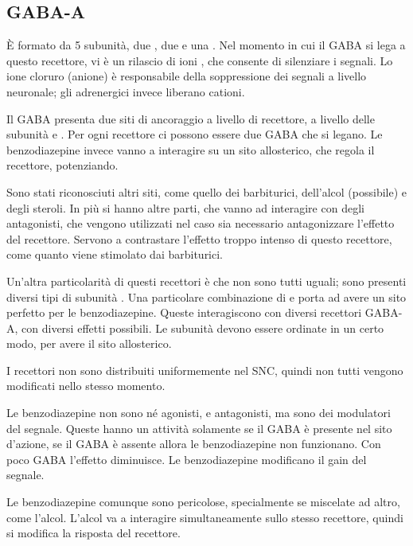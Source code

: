 \subsection{GABA-A}


È formato da 5 subunità, due \alpha, due \beta{} e una \gamma. Nel
momento in cui il GABA si lega a questo recettore, vi è un rilascio di
ioni , che consente di silenziare i segnali.
Lo ione cloruro (anione) è responsabile della soppressione dei segnali a
livello neuronale; gli adrenergici invece liberano cationi.

Il GABA presenta due siti di ancoraggio a livello di recettore, a
livello delle subunità \alpha{} e \beta. Per ogni recettore ci possono
essere due GABA che si legano.
Le benzodiazepine invece vanno a interagire su un sito allosterico, che
regola il recettore, potenziando.

Sono stati riconosciuti altri siti, come quello dei barbiturici,
dell'alcol (possibile) e degli steroli. In più si hanno altre parti, che
vanno ad interagire con degli antagonisti, che vengono utilizzati nel
caso sia necessario antagonizzare l'effetto del recettore. Servono a
contrastare l'effetto troppo intenso di questo recettore, come quanto
viene stimolato dai barbiturici.

Un'altra particolarità di questi recettori è che non sono tutti uguali;
sono presenti diversi tipi di subunità \alpha. Una particolare
combinazione di \alpha{} e \gamma{} porta ad avere un sito perfetto per le
benzodiazepine. Queste interagiscono con diversi recettori GABA-A, con
diversi effetti possibili. Le subunità devono essere ordinate in un
certo modo, per avere il sito allosterico.

I recettori non sono distribuiti uniformemente nel SNC, quindi non tutti
vengono modificati nello stesso momento.

Le benzodiazepine non sono né agonisti, e antagonisti, ma sono dei
modulatori del segnale. Queste hanno un attività solamente se il GABA è
presente nel sito d'azione, se il GABA è assente allora le
benzodiazepine non funzionano. Con poco GABA l'effetto diminuisce. Le
benzodiazepine modificano il gain del segnale.

Le benzodiazepine comunque sono pericolose, specialmente se miscelate ad
altro, come l'alcol. L'alcol va a interagire simultaneamente sullo
stesso recettore, quindi si modifica la risposta del recettore.



